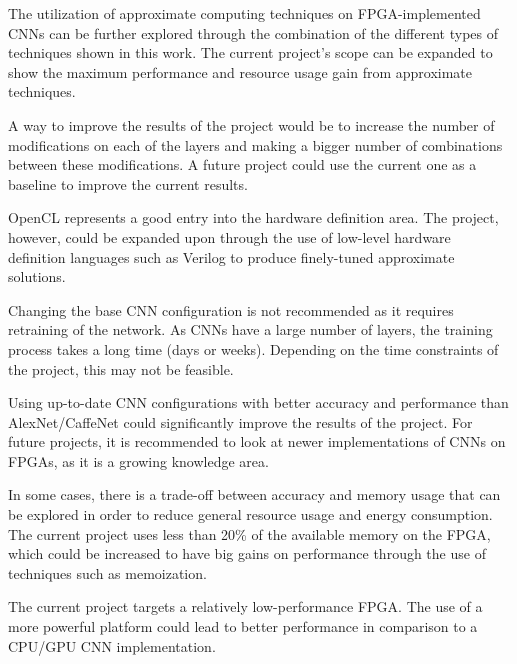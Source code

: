 The utilization of approximate computing techniques on FPGA-implemented
CNNs can be further explored through the combination of the different types
of techniques shown in this work. The current project's scope can
be expanded to show the maximum performance and resource usage gain
from approximate techniques.

A way to improve the results of the project would be to increase
the number of modifications on each of the layers and making
a bigger number of combinations between these modifications.
A future project could use the current one as a baseline to
improve the current results.

OpenCL represents a good entry into the hardware definition area.
The project, however, could be expanded upon through the use of
low-level hardware definition languages such as Verilog to produce
finely-tuned approximate solutions.

Changing the base CNN configuration is not recommended as it requires
retraining of the network. As CNNs have a large number of layers,
the training process takes a long time (days or weeks). Depending
on the time constraints of the project, this may not be feasible.

Using up-to-date CNN configurations with better accuracy and
performance than AlexNet/CaffeNet could significantly improve
the results of the project. For future projects, it is 
recommended to look at
newer implementations of CNNs on FPGAs, as it is a growing
knowledge area.

In some cases, there is a trade-off between accuracy and memory usage
that can be explored in order to reduce general resource usage and
energy consumption. The current project uses less than 20\% of the
available memory on the FPGA, which could be increased to have
big gains on performance through the use of techniques such as
memoization.

The current project targets a relatively low-performance FPGA. The use
of a more powerful platform could lead to better performance
in comparison to a CPU/GPU CNN implementation.